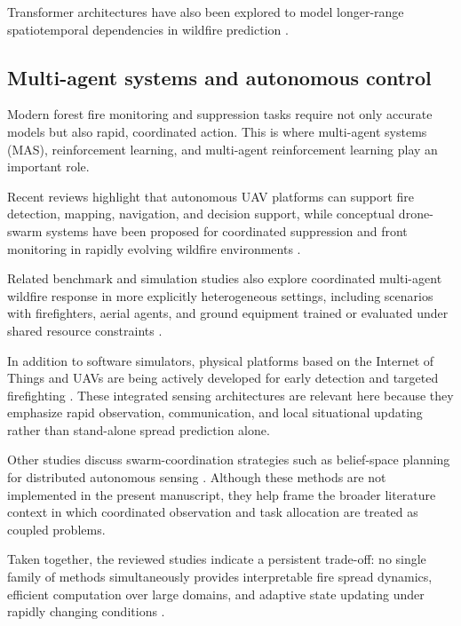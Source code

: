 \documentclass[10pt,letterpaper]{article}
\begin{document}
Transformer architectures have also been explored to model longer-range
spatiotemporal dependencies in wildfire prediction \cite{andrianarivony2024}.

\subsection*{Multi-agent systems and autonomous control}

Modern forest fire monitoring and suppression tasks require not only
accurate models but also rapid, coordinated action. This is where
multi-agent systems (MAS), reinforcement learning, and multi-agent
reinforcement learning play an important role.

Recent reviews highlight that autonomous UAV platforms can support fire
detection, mapping, navigation, and decision support, while conceptual
drone-swarm systems have been proposed for coordinated suppression and
front monitoring in rapidly evolving wildfire environments
\cite{partheepan2023,ausonio2021}.

Related benchmark and simulation studies also explore coordinated
multi-agent wildfire response in more explicitly heterogeneous settings,
including scenarios with firefighters, aerial agents, and ground
equipment trained or evaluated under shared resource constraints
\cite{ramadan2024,partheepan2023}.

In addition to software simulators, physical platforms based on the
Internet of Things and UAVs are being actively developed for early
detection and targeted firefighting \cite{ramadan2024}. These integrated sensing
architectures are relevant here because they emphasize rapid
observation, communication, and local situational updating rather than
stand-alone spread prediction alone.

Other studies discuss swarm-coordination strategies such as belief-space
planning for distributed autonomous sensing \cite{ausonio2021}. Although
these methods are not implemented in the present manuscript, they help
frame the broader literature context in which coordinated observation
and task allocation are treated as coupled problems.

Taken together, the reviewed studies indicate a persistent trade-off:
no single family of methods simultaneously provides interpretable fire
spread dynamics, efficient computation over large domains, and adaptive
state updating under rapidly changing conditions
\cite{freire2019,schumaker2022,navasmontilla2025,andrianarivony2024,marjani2023,partheepan2023,ausonio2021,ramadan2024}.
\end{document}
